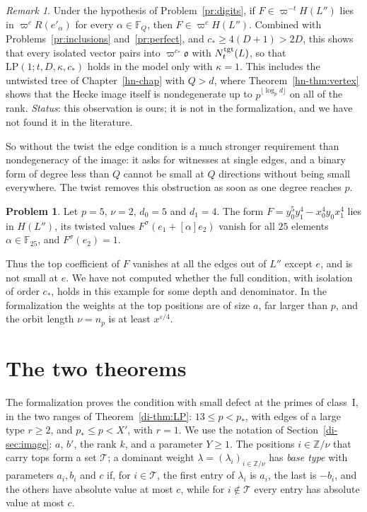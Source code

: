 \documentclass[reqno]{amsart}
\newcounter{chap}
\theoremstyle{definition}
\newtheorem{problem}{Problem}[section]
\theoremstyle{plain}
\theoremstyle{remark}
\newtheorem{remark}{Remark}[section]
\newcommand{\Z}{\mathbb Z}
\newcommand{\F}{\mathbb F}
\newcommand{\LP}{\mathrm{LP}}
\newcommand{\Ntgt}{N^{\rm tgt}}
\newcommand{\vo}{\mathfrak o}
\begin{document}
\begin{remark}\label{pr:obstruction}\label{pr:vacuous}\label{pr:untwisted}
Under the hypothesis of Problem~\ref{pr:digits}, if \(F\in\varpi^{-t}H(L'')\) lies in \(\varpi^cR(e'_\alpha)\) for every \(\alpha\in\F_Q\), then \(F\in\varpi^cH(L'')\).  Combined with Problems~\ref{pr:inclusions} and~\ref{pr:perfect}, and \(c_*\ge4(D+1)>2D\), this shows that every isolated vector pairs into \(\varpi^{c_*}\vo\) with \(\Ntgt_t(L)\), so that \(\LP(1;t,D,\kappa,c_*)\) holds in the model only with \(\kappa=1\).  This includes the untwisted tree of Chapter~\ref{hn-chap} with \(Q>d\), where Theorem~\ref{hn-thm:vertex} shows that the Hecke image itself is nondegenerate up to \(p^{\lfloor\log_pd\rfloor}\) on all of the rank.  \emph{Status}: this observation is ours; it is not in the formalization, and we have not found it in the literature.
\end{remark}

So without the twist the edge condition is a much stronger requirement than nondegeneracy of the image: it asks for witnesses at single edges, and a binary form of degree less than \(Q\) cannot be small at \(Q\) directions without being small everywhere.  The twist removes this obstruction as soon as one degree reaches \(p\).

\begin{problem}\label{pr:twisted-example}
Let \(p=5\), \(\nu=2\), \(d_0=5\) and \(d_1=4\).  The form \(F=y_0^5y_1^4-x_0^4y_0x_1^4\) lies in \(H(L'')\), its twisted values \(F^\sigma(e_1+[\alpha]e_2)\) vanish for all \(25\) elements \(\alpha\in\F_{25}\), and \(F^\sigma(e_2)=1\).
\end{problem}

Thus the top coefficient of \(F\) vanishes at all the edges out of \(L''\) except \(e\), and is not small at \(e\).  We have not computed whether the full condition, with isolation of order \(c_*\), holds in this example for some depth and denominator.  In the formalization the weights at the top positions are of size \(a\), far larger than \(p\), and the orbit length \(\nu=n_p\) is at least \(x^{\varepsilon/4}\).

\section{The two theorems}\label{sec:theorems}

The formalization proves the condition with small defect at the primes of class~I, in the two ranges of Theorem~\ref{di-thm:LP}: \(13\le p<p_*\), with edges of a large type \(r\ge2\), and \(p_*\le p<X'\), with \(r=1\).  We use the notation of Section~\ref{di-sec:image}: \(a\), \(b'\), the rank \(k\), and a parameter \(Y\ge1\).  The positions \(i\in\Z/\nu\) that carry tops form a set \(\mathcal T\); a dominant weight \(\lambda=(\lambda_i)_{i\in\Z/\nu}\) has \emph{base type} with parameters \(a_i,b_i\) and \(c\) if, for \(i\in\mathcal T\), the first entry of \(\lambda_i\) is \(a_i\), the last is \(-b_i\), and the others have absolute value at most \(c\), while for \(i\notin\mathcal T\) every entry has absolute value at most \(c\).
\end{document}
